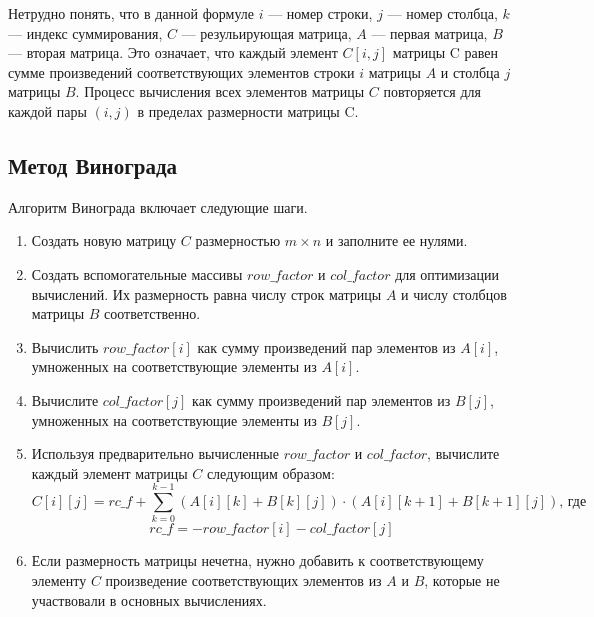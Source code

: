 \documentclass[12pt, a4paper]{article}
\begin{document}
Нетрудно понять, что в данной формуле $i$ --- номер строки, $j$ --- номер столбца, $k$ --- индекс суммирования, $C$ --- резульирующая матрица, $A$ --- первая матрица, $B$ --- вторая матрица. Это означает, что каждый элемент $C[i, j]$ матрицы C равен сумме произведений соответствующих элементов строки $i$ матрицы $A$ и столбца $j$ матрицы $B$. Процесс вычисления всех элементов матрицы $C$ повторяется для каждой пары $(i, j)$ в пределах размерности матрицы C.

\subsection{Метод Винограда}
Алгоритм Винограда включает следующие шаги.
\begin{enumerate}
    \item Создать новую матрицу $C$ размерностью $m \times n$ и заполните ее нулями.
    \item Создать вспомогательные массивы $row\_factor$ и $col\_factor$ для оптимизации вычислений. Их размерность равна числу строк матрицы $A$ и числу столбцов матрицы $B$ соответственно.
    \item Вычислить $row\_factor[i]$ как сумму произведений пар элементов из $A[i]$, умноженных на соответствующие элементы из $A[i]$.
    \item Вычислите $col\_factor[j]$ как сумму произведений пар элементов из $B[j]$, умноженных на соответствующие элементы из $B[j]$.
    \item Используя предварительно вычисленные $row\_factor$ и $col\_factor$, вычислите каждый элемент матрицы $C$ следующим образом: 
    \[ C[i][j] = rc\_f + \sum_{k=0}^{k-1} (A[i][k] + B[k][j]) \cdot (A[i][k+1] + B[k+1][j]) \text{, где}\]  \[ rc\_f = -row\_factor[i] - col\_factor[j] \] 
    \item Если размерность матрицы нечетна, нужно добавить к соответствующему элементу $C$ произведение соответствующих элементов из $A$ и $B$, которые не участвовали в основных вычислениях.
\end{enumerate}
\end{document}
